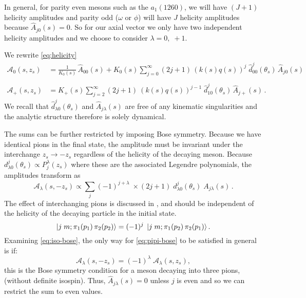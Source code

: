 \documentclass[10pt, aps,prd,amsmath,amssymb,superscriptaddress,onecolumn,
nofootinbib,showpacs,preprintnumbers]{revtex4-1}
\begin{document}
In general, for parity even mesons such as the \(a_1(1260)\), we will have \((J +1)\) helicity amplitudes and parity odd (\(\omega \text{ or } \phi\)) will have \(J\) helicity amplitudes because \(\hat{A}_{j0}(s) = 0\). So for our axial vector we only have two independent helicity amplitudes and we choose to consider \(\lambda = 0,\; +1\).

We rewrite \cref{eq:helicity}
  \begin{align}
    \label{eq:model-helicity-zero}
    \mathcal{A}_0(s,z_s) &= \frac{1}{K_{0}(s)} \, \hat{A}_{00}(s) + K_{0}(s) \sum_{j = 0}^\infty (2j+1) \, (k(s)q(s))^j \; \hat{d}_{00}^j(\theta_s) \, \hat{A}_{j0}(s) \\
    \nonumber \\
    \label{eq:model-helicity-plus}
    \mathcal{A}_+(s,z_s) &=  K_{+}(s) \sum_{j = 2}^\infty (2j+1) \ (k(s)q(s))^{j-1} \;  \hat{d}_{10}^j(\theta_s) \, \hat{A}_{j+}(s) \,.
   \end{align}
We recall that \(\hat{d}^j_{\lambda 0}(\theta_s)\) and \(\hat{A}_{j\lambda}(s)\) are free of any kinematic singularities and the analytic structure therefore is solely dynamical.

The sums can be further restricted by imposing Bose symmetry. Because we have identical pions in the final state, the amplitude must be invariant under the interchange \(z_s \to -z_s\) regardless of the helicity of the decaying meson.
Because \(d^j_{\lambda0}(\theta_s) \propto P^\lambda_j(z_s)\) where these are the associated Legendre polynomials, the amplitudes transform as
  \begin{equation}
    \label{eq:iso-bose}
   \mathcal{A}_{\lambda}(s, -z_s) \propto \sum_{j} (-1)^{j+\lambda} \; \times (2j+1) \;  d^j_{\lambda0}(\theta_s) \; A_{j\lambda}(s) \,.
  \end{equation}
The effect of interchanging pions is discussed in \cite{JACOB1959404}, and should be independent of the helicity of the decaying particle in the initial state.
  \begin{equation}
    \label{eq:pipi-bose}
    \ket{j \; m ; \pi_1(p_1) \, \pi_2(p_2)} = (-1)^j \; \ket{j \; m; \pi_1(p_2) \, \pi_2(p_1)}.
  \end{equation}
Examining \cref{eq:iso-bose}, the only way for \cref{eq:pipi-bose} to be satisfied in general is if:
  \begin{equation}
    \label{eq:helicity-bose}
    \mathcal{A}_{\lambda}(s,-z_s) = (-1)^\lambda \; \mathcal{A}_{\lambda}(s, z_s),
  \end{equation}
this is the Bose symmetry condition for a meson decaying into three pions, (without definite isospin).
Thus, \(\hat{A}_{j\lambda}(s) = 0\) unless \(j\) is even and so we can restrict the sum to even values.
\end{document}

